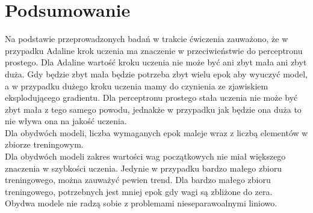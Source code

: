 \documentclass{article}
\begin{document}
	\section{Podsumowanie}
	
	
	Na podstawie przeprowadzonych badań w trakcie ćwiczenia zauważono, że w przypadku Adaline krok uczenia ma znaczenie w przeciwieństwie do perceptronu prostego. Dla Adaline wartość kroku uczenia nie może być ani zbyt mała ani zbyt duża. Gdy będzie zbyt mała będzie potrzeba zbyt wielu epok aby wyuczyć model, a w przypadku dużego kroku uczenia mamy do czynienia ze zjawiskiem eksplodującego gradientu. Dla perceptronu prostego stała uczenia nie może być zbyt mała z tego samego powodu, jednakże w przypadku jak będzie ona duża to nie wływa ona na jakość uczenia.\\[0.3cm]
	
Dla obydwóch modeli, liczba wymaganych epok maleje wraz z liczbą elementów w zbiorze treningowym.\\[0.3cm]
	
Dla obydwóch modeli zakres wartości wag początkowych nie miał większego znaczenia w szybkości uczenia. Jedynie w przypadku bardzo małego zbioru treningowego, można zauważyć pewien trend. Dla bardzo małego zbioru treningowego, potrzebnych jest mniej epok gdy wagi są zbliżone do zera. \\[0.3cm]

Obydwa modele nie radzą sobie z problemami nieseparawoalnymi liniowo.\\[0.3cm]
\end{document}
